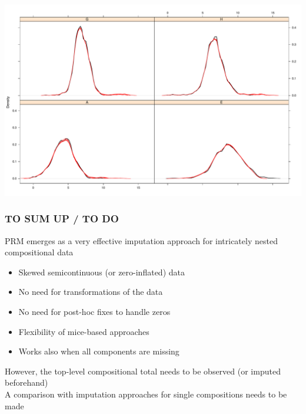 \documentclass[aspectratio=169]{beamer} %
\begin{document}
  \begin{frame}
  \centering
\includegraphics[scale=.3]{plotdens.pdf}
 \end{frame}
 
 \begin{frame}
   \frametitle{TO SUM UP / TO DO}
 PRM emerges as a very effective imputation approach for intricately nested compositional data
 \begin{itemize}
 \item Skewed semicontinuous (or zero-inflated) data 
 \item No need for transformations of the data
 \item No need for post-hoc fixes to handle zeros
 \item Flexibility of mice-based approaches
 \item Works also when all components are missing
 \end{itemize}
 \vspace{.15 in}
 However, the top-level compositional total needs to be observed (or imputed beforehand)
 \newline \\
 A comparison with imputation approaches for single compositions needs to be made
 \end{frame}
\end{document}
